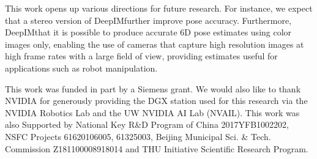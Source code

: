 \documentclass[twocolumn]{svjour3}
\newcommand{\dimnet}[0]{DeepIM}
\begin{document}
This work opens up various directions for future research. For instance, we expect that a stereo version of \dimnet\could further improve pose accuracy. Furthermore, \dimnet\indicates that it is possible to produce accurate 6D pose estimates using color images only, enabling the use of cameras that capture high resolution images at high frame rates with a large field of view, providing  estimates useful for applications such as robot manipulation.

\begin{acknowledgements}
This work was funded in part by a Siemens grant. We would also like to thank NVIDIA for generously providing the DGX station used for this research via the NVIDIA Robotics Lab and the UW NVIDIA AI Lab (NVAIL). This work was also Supported by National Key R\&D Program of China 2017YFB1002202, NSFC Projects 61620106005, 61325003, Beijing Municipal Sci. \& Tech. Commission Z181100008918014 and THU Initiative Scientific Research Program.
\end{acknowledgements}





\end{document}
